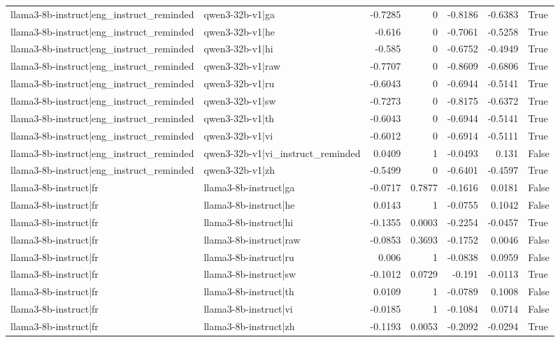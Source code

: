 \begin{table}
\begin{tabular}{l l r r r r l}
llama3-8b-instruct|eng_instruct_reminded & qwen3-32b-v1|ga & -0.7285 & 0 & -0.8186 & -0.6383 & True \\
llama3-8b-instruct|eng_instruct_reminded & qwen3-32b-v1|he & -0.616 & 0 & -0.7061 & -0.5258 & True \\
llama3-8b-instruct|eng_instruct_reminded & qwen3-32b-v1|hi & -0.585 & 0 & -0.6752 & -0.4949 & True \\
llama3-8b-instruct|eng_instruct_reminded & qwen3-32b-v1|raw & -0.7707 & 0 & -0.8609 & -0.6806 & True \\
llama3-8b-instruct|eng_instruct_reminded & qwen3-32b-v1|ru & -0.6043 & 0 & -0.6944 & -0.5141 & True \\
llama3-8b-instruct|eng_instruct_reminded & qwen3-32b-v1|sw & -0.7273 & 0 & -0.8175 & -0.6372 & True \\
llama3-8b-instruct|eng_instruct_reminded & qwen3-32b-v1|th & -0.6043 & 0 & -0.6944 & -0.5141 & True \\
llama3-8b-instruct|eng_instruct_reminded & qwen3-32b-v1|vi & -0.6012 & 0 & -0.6914 & -0.5111 & True \\
llama3-8b-instruct|eng_instruct_reminded & qwen3-32b-v1|vi_instruct_reminded & 0.0409 & 1 & -0.0493 & 0.131 & False \\
llama3-8b-instruct|eng_instruct_reminded & qwen3-32b-v1|zh & -0.5499 & 0 & -0.6401 & -0.4597 & True \\
llama3-8b-instruct|fr & llama3-8b-instruct|ga & -0.0717 & 0.7877 & -0.1616 & 0.0181 & False \\
llama3-8b-instruct|fr & llama3-8b-instruct|he & 0.0143 & 1 & -0.0755 & 0.1042 & False \\
llama3-8b-instruct|fr & llama3-8b-instruct|hi & -0.1355 & 0.0003 & -0.2254 & -0.0457 & True \\
llama3-8b-instruct|fr & llama3-8b-instruct|raw & -0.0853 & 0.3693 & -0.1752 & 0.0046 & False \\
llama3-8b-instruct|fr & llama3-8b-instruct|ru & 0.006 & 1 & -0.0838 & 0.0959 & False \\
llama3-8b-instruct|fr & llama3-8b-instruct|sw & -0.1012 & 0.0729 & -0.191 & -0.0113 & True \\
llama3-8b-instruct|fr & llama3-8b-instruct|th & 0.0109 & 1 & -0.0789 & 0.1008 & False \\
llama3-8b-instruct|fr & llama3-8b-instruct|vi & -0.0185 & 1 & -0.1084 & 0.0714 & False \\
llama3-8b-instruct|fr & llama3-8b-instruct|zh & -0.1193 & 0.0053 & -0.2092 & -0.0294 & True \\

\end{tabular}
\end{table}
